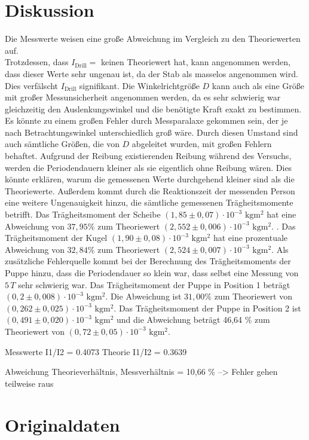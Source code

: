 \section{Diskussion}
\label{sec:Diskussion}
Die Messwerte weisen eine große Abweichung im Vergleich zu den Theoriewerten auf.  \\
Trotzdessen, dass $I_{\text{Drill}} = $ keinen Theoriewert hat, kann angenommen werden, dass dieser Werte sehr ungenau ist, da der Stab 
als masselos angenommen wird. Dies verfälscht $I_{\text{Drill}}$ signifikant. Die Winkelrichtgröße $D$ kann auch als eine Größe mit großer Messunsicherheit angenommen
werden, da es sehr schwierig war gleichzeitig den Auslenkungswinkel und die benötigte Kraft exakt zu bestimmen. Es könnte zu einem großen 
Fehler durch Messparalaxe gekommen sein, der je nach Betrachtungswinkel unterschiedlich groß wäre. Durch diesen Umstand sind auch sämtliche 
Größen, die von $D$ abgeleitet wurden, mit großen Fehlern behaftet. Aufgrund der Reibung existierenden Reibung während des Versuchs, werden die 
Periodendauern kleiner als sie eigentlich ohne Reibung wären. Dies könnte erklären, warum die gemessenen Werte durchgehend kleiner sind als die 
Theoriewerte. Außerdem kommt durch die Reaktionszeit der messenden Person eine weitere Ungenauigkeit hinzu, die sämtliche gemessenen 
Trägheitsmomente betrifft.
Das Trägheitsmoment der Scheibe $(1,85 \pm 0,07) \cdot 10^{-3} \,\,\unit{\kilo\gram\meter\squared}$ hat eine Abweichung von $37,95 \%$ zum Theoriewert $(2,552 \pm 0,006) \cdot 10^{-3} \,\,\unit{\kilo\gram\meter\squared}$.
 . Das Trägheitsmoment der Kugel $(1,90 \pm 0,08) \cdot 10^{-3} \,\,\unit{\kilo\gram\meter\squared}$ hat eine prozentuale 
Abweichung von $32,84 \%$ zum Theoriewert $(2,524 \pm 0,007) \cdot 10^{-3} \,\,\unit{\kilo\gram\meter\squared}$. 
Als zusätzliche Fehlerquelle kommt bei der Berechnung des Trägheitsmoments der Puppe hinzu, dass die Periodendauer so klein war, dass selbst eine
Messung von $5\,T$ sehr schwierig war. Das Trägheitsmoment der Puppe in Position 1 beträgt $(0,2 \pm 0,008) \cdot 10^{-3}\,\, \unit{\kilo\gram\meter\squared}$.
 Die Abweichung ist $31,00 \%$ zum Theoriewert von $(0,262 \pm 0,025) \cdot 10^{-3}\,\, \unit{\kilo\gram\meter\squared}$.
Das Trägheitsmoment der Puppe in Position 2 ist $ (0,491 \pm 0,020) \cdot 10^{-3}\,\, \unit{\kilo\gram\meter\squared}$ und die Abweichung beträgt 46,64 \% zum Theoriewert 
von $(0,72 \pm 0,05) \cdot 10^{-3}\,\, \unit{\kilo\gram\meter\squared}$.

Messwerte I1/I2 = 0.4073
Theorie I1/I2 = 0.3639

Abweichung Theorieverhältnis, Messverhältnis = 10,66 \%
--> Fehler gehen teilweise raus 
\section{Originaldaten}
\label{sec:Originaldaten}
